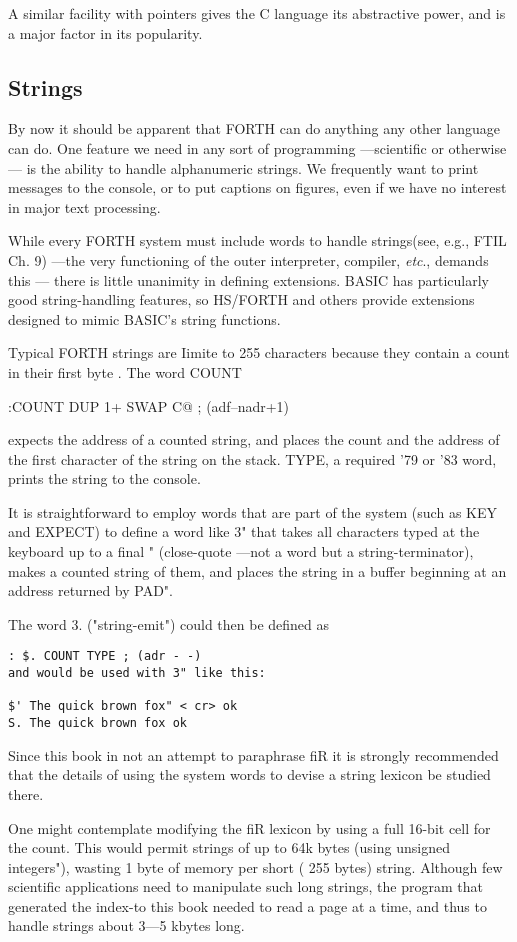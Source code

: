 A similar facility with pointers gives the C language its abstractive power, and is a major factor in its popularity.

\subsection{Strings}
By now it should be apparent that FORTH can do anything any other language can do. One feature we need in any sort of programming —scientific or otherwise — is the ability to handle alphanumeric strings. We frequently want to print messages to the console, or to put captions on figures, even if we have no interest in major text processing.

While every FORTH system must include words to handle strings(see, e.g., FTIL Ch. 9) —the very functioning of the outer interpreter, compiler, \textit{etc}., demands this — there is little unanimity in defining extensions. BASIC has particularly good string-handling features, so HS/FORTH and others provide extensions designed to mimic BASIC’s string functions.

Typical FORTH strings are Iimite to 255 characters because they
contain a count in their first byte . The word COUNT

:COUNT DUP 1+ SWAP C@ ; (adf--nadr+1)

expects the address of a counted string, and places the count and
the address of the first character of the string on the stack. TYPE,
a required ’79 or ’83 word, prints the string to the console.

It is straightforward to employ words that are part of the system
(such as KEY and EXPECT) to define a word like 3" that takes
all characters typed at the keyboard up to a final " (close-quote
—not a word but a string-terminator), makes a counted string of
them, and places the string in a buffer beginning at an address
returned by PAD".

The word 3. ("string-emit") could then be defined as
\begin{verbatim}
: $. COUNT TYPE ; (adr - -)
and would be used with 3" like this:

$' The quick brown fox" < cr> ok
S. The quick brown fox ok
\end{verbatim}

Since this book in not an attempt to paraphrase fiR it is strongly
recommended that the details of using the system words to devise
a string lexicon be studied there.

One might contemplate modifying the fiR lexicon by using a
full 16-bit cell for the count. This would permit strings of up to
64k bytes (using unsigned integers"), wasting 1 byte of memory
per short ( 255 bytes) string. Although few scientific applications
need to manipulate such long strings, the program that generated
the index-to this book needed to read a page at a time, and thus
to handle strings about 3—5 kbytes long.


